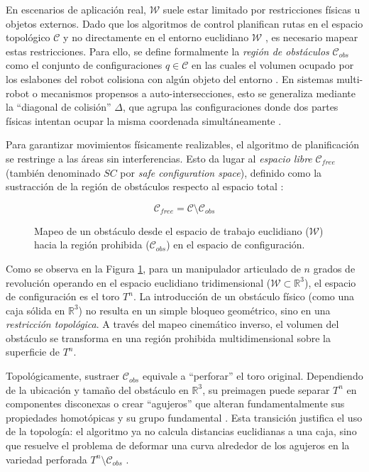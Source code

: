 En escenarios de aplicación real, $\mathcal{W}$ suele estar limitado por 
restricciones físicas u objetos externos. Dado que los algoritmos de control 
planifican rutas en el espacio topológico $\mathcal{C}$ y no directamente en el 
entorno euclidiano $\mathcal{W}$ \parencite{grant2015topology}, es necesario 
mapear estas restricciones. Para ello, se define formalmente 
la \textit{región de obstáculos} $\mathcal{C}_{obs}$ como el 
conjunto de configuraciones $q \in \mathcal{C}$ en las cuales el 
volumen ocupado por los eslabones del robot colisiona con algún objeto del 
entorno \parencite{lynch2017modern}. En sistemas multi-robot o 
mecanismos propensos a auto-intersecciones, esto se generaliza mediante 
la \enquote{diagonal de colisión} $\Delta$, que agrupa las configuraciones donde dos 
partes físicas intentan ocupar la misma coordenada 
simultáneamente \parencite{oniani2019topology}.

Para garantizar movimientos físicamente realizables, el algoritmo de planificación 
se restringe a las áreas sin interferencias. Esto da 
lugar al \textit{espacio libre} $\mathcal{C}_{free}$ (también denominado $SC$ 
por \textit{safe configuration space}), definido como 
la sustracción de la región de obstáculos respecto al espacio 
total \parencite{oniani2019topology}:

$$ \mathcal{C}_{free} = \mathcal{C} \setminus \mathcal{C}_{obs} $$

\begin{figure}[htbp]
    \centering
    

    \caption{Mapeo de un obstáculo desde el espacio de trabajo euclidiano ($\mathcal{W}$) hacia la región prohibida ($\mathcal{C}_{obs}$) en el espacio de configuración.}
    \label{fig:mapeo_cspace}
\end{figure}

Como se observa en la Figura \ref{fig:mapeo_cspace}, para un manipulador articulado de $n$ grados de revolución operando en el 
espacio euclidiano tridimensional ($\mathcal{W} \subset \mathbb{R}^3$), 
el espacio de configuración es el toro $T^n$. La introducción de un 
obstáculo físico (como una caja sólida en $\mathbb{R}^3$) no 
resulta en un simple bloqueo geométrico, sino en una \textit{restricción topológica}. 
A través del mapeo cinemático inverso, el volumen del obstáculo 
se transforma en una región prohibida multidimensional sobre la superficie de $T^n$.

Topológicamente, sustraer $\mathcal{C}_{obs}$ equivale a \enquote{perforar} el toro original. 
Dependiendo de la ubicación y tamaño del obstáculo en $\mathbb{R}^3$, su 
preimagen puede separar $T^n$ en componentes disconexas o crear \enquote{agujeros} que alteran 
fundamentalmente sus propiedades homotópicas y su grupo fundamental 
\parencite{Mosquera2017}. Esta transición justifica el uso de la topología: 
el algoritmo ya no calcula distancias euclidianas a una caja, sino que resuelve 
el problema de deformar una curva alrededor de los agujeros en la variedad 
perforada $T^n \setminus \mathcal{C}_{obs}$ \parencite{farber2008}.


